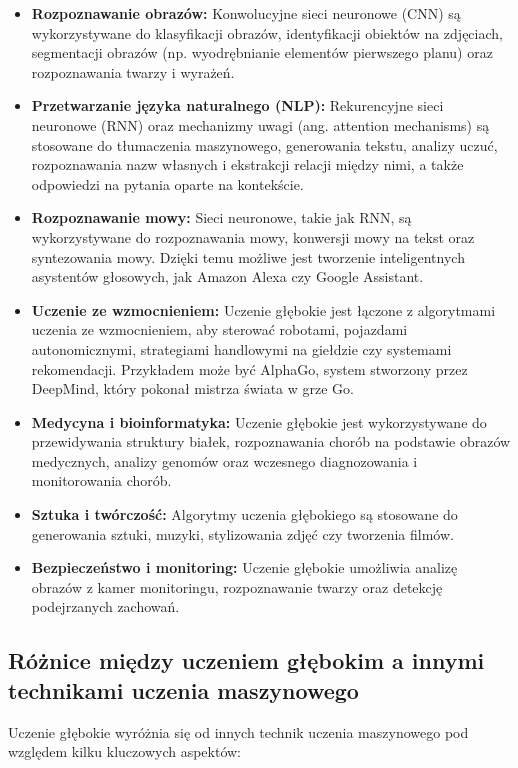 \begin{itemize}
\item \textbf{Rozpoznawanie obrazów:} Konwolucyjne sieci neuronowe (CNN) są wykorzystywane do klasyfikacji obrazów, identyfikacji obiektów na zdjęciach, segmentacji obrazów (np. wyodrębnianie elementów pierwszego planu) oraz rozpoznawania twarzy i wyrażeń.

\item \textbf{Przetwarzanie języka naturalnego (NLP):} Rekurencyjne sieci neuronowe (RNN) oraz mechanizmy uwagi (ang. attention mechanisms) są stosowane do tłumaczenia maszynowego, generowania tekstu, analizy uczuć, rozpoznawania nazw własnych i ekstrakcji relacji między nimi, a także odpowiedzi na pytania oparte na kontekście.

\item \textbf{Rozpoznawanie mowy:} Sieci neuronowe, takie jak RNN, są wykorzystywane do rozpoznawania mowy, konwersji mowy na tekst oraz syntezowania mowy. Dzięki temu możliwe jest tworzenie inteligentnych asystentów głosowych, jak Amazon Alexa czy Google Assistant.

\item \textbf{Uczenie ze wzmocnieniem:} Uczenie głębokie jest łączone z algorytmami uczenia ze wzmocnieniem, aby sterować robotami, pojazdami autonomicznymi, strategiami handlowymi na giełdzie czy systemami rekomendacji. Przykładem może być AlphaGo, system stworzony przez DeepMind, który pokonał mistrza świata w grze Go.

\item \textbf{Medycyna i bioinformatyka:} Uczenie głębokie jest wykorzystywane do przewidywania struktury białek, rozpoznawania chorób na podstawie obrazów medycznych, analizy genomów oraz wczesnego diagnozowania i monitorowania chorób.

\item \textbf{Sztuka i twórczość:} Algorytmy uczenia głębokiego są stosowane do generowania sztuki, muzyki, stylizowania zdjęć czy tworzenia filmów.

\item \textbf{Bezpieczeństwo i monitoring:} Uczenie głębokie umożliwia analizę obrazów z kamer monitoringu, rozpoznawanie twarzy oraz detekcję podejrzanych zachowań.

\end{itemize}

\subsection{Różnice między uczeniem głębokim a innymi technikami uczenia maszynowego}
Uczenie głębokie wyróżnia się od innych technik uczenia maszynowego pod względem kilku kluczowych aspektów:

